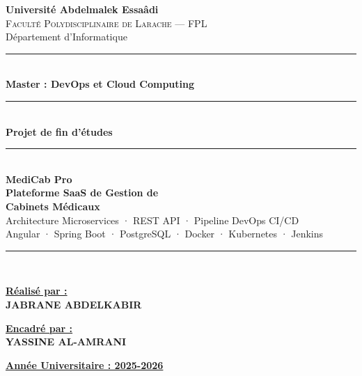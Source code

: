 \documentclass[final]{report}
\begin{document}
 
\begin{titlepage}
  \centering
  \vspace*{1cm}
 
  {\Large\bfseries Université Abdelmalek Essaâdi}\\[0.3cm]
  {\large\scshape Faculté Polydisciplinaire de Larache --- FPL}\\[0.2cm]
  {\large Département d'Informatique}\\[1cm]
 
  \rule{\linewidth}{1.5pt}\\[0.4cm]
  {\LARGE\bfseries\color{blueUAE} Master : DevOps et Cloud Computing}\\[0.4cm]
  \rule{\linewidth}{1.5pt}\\[0.8cm]
 
  {\large\bfseries Projet de fin d'études}\\[1.2cm]
 
  \rule{0.85\linewidth}{2pt}\\[0.5cm]
  {\Huge\bfseries\color{blueUAE} MediCab Pro}\\[0.4cm]
  {\LARGE\bfseries\color{blueUAE} Plateforme SaaS de Gestion de}\\[0.3cm]
  {\LARGE\bfseries\color{blueUAE} Cabinets Médicaux}\\[0.3cm]
  {\large Architecture Microservices · REST API · Pipeline DevOps CI/CD}\\[0.3cm]
  {\large Angular · Spring Boot · PostgreSQL · Docker · Kubernetes · Jenkins}\\[0.3cm]
  \rule{0.85\linewidth}{2pt}\\[2cm]
 
  \begin{minipage}[t]{0.45\textwidth}
    \raggedright
    {\large\bfseries\underline{Réalisé par :}}\\[0.3cm]
    {\large\bfseries JABRANE ABDELKABIR}
  \end{minipage}
  \hfill
  \begin{minipage}[t]{0.45\textwidth}
    \raggedright
    {\large\bfseries\underline{Encadré par :}}\\[0.3cm]
    {\large\bfseries YASSINE AL-AMRANI}
  \end{minipage}
 
  \vfill
  {\large\underline{\bfseries Année Universitaire : 2025-2026}}
\end{titlepage}
 
\end{document}
